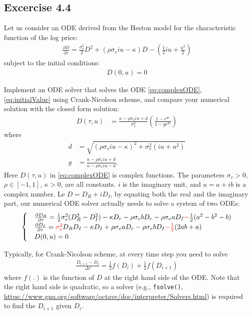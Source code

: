 \documentclass[10pt,a4paper,hidelinks,fleqn]{article}            %
\newcommand{\pder}[2]{\frac{\partial#1}{\partial#2}}
\begin{document}
\subsection*{Excercise 4.4}
Let us consider an ODE derived from the Heston model for the characteristic function \cite{heston93} of the log price:
\begin{align}
\pder{D}{\tau} = \frac{\sigma_v^2}{2} D^2 + (\rho\sigma_viu - \kappa)D - (\frac12 iu + \frac{u^2}{2})
\label{eq:complexODE}
\end{align}
subject to the initial conditions:
\begin{align}
D(0, u) = 0
\label{eq:initialValue}
\end{align}

Implement an ODE solver that solves the ODE \eqref{eq:complexODE}, \eqref{eq:initialValue} using Crank-Nicolson scheme,
and compare your numerical solution with the closed form solution:
\begin{align}
D(\tau, u) & = \frac{\kappa - \rho \sigma_v iu + d}{\sigma_v^2} \left( \frac{1-e^{d\tau}}{1-ge^{d\tau}} \right)
\label{eq:closedFormD}
\end{align}
where
\begin{align}
d & = \sqrt{(\rho \sigma_v iu - \kappa)^2 + \sigma_v^2 (iu+u^2)} \\
g & = \frac{\kappa - \rho \sigma_v iu + d}{\kappa - \rho \sigma_v iu - d}.
\end{align}
Here $D(\tau, u)$ in \eqref{eq:complexODE} is complex functions.
The parameters $\sigma_v > 0$, $\rho \in [-1, 1]$, $\kappa > 0$, are all constants. 
$i$ is the imaginary unit, and $u=a+ib$ is a complex number.
Le $D = D_R + iD_I$, by equating both the real and the imaginary part, 
our numerical ODE solver actually needs to solve a system of two ODEs:
\begin{align}
\begin{cases}
& \pder{D_R}{\tau} = \frac{1}{2}\sigma_v^2 (D_R^2 - D_I^2) - \kappa D_r  - \rho \sigma_v b D_r - \rho \sigma_v a D_I  \textbf{\textcolor{red}{$-$}} \frac{1}{2}(a^2 - b^2 - b) \\
& \pder{D_I}{\tau} = \textbf{\textcolor{red}{$\sigma_v^2$}} D_R D_I - \kappa D_I + \rho \sigma_v a D_r - \rho \sigma_v b D_I \textbf{\textcolor{red}{$-\frac12$}} (2ab + a) \\ 
& D(0, u) = 0
\end{cases}
\end{align}

Typically, for Crank-Nicolson scheme, at every time step you need to solve 
\begin{align*}
\frac{D_{i+1} - D_i}{\Delta \tau} = \frac{1}{2}f(D_i) + \frac{1}{2}f(D_{i+1})
\end{align*}
where $f(.)$ is the function of $D$ at the right hand side of the ODE.
Note that the right hand side is quadratic, 
so a solver (e.g., \verb=fsolve()=, \url{https://www.gnu.org/software/octave/doc/interpreter/Solvers.html}) is required to find the $D_{i+1}$ given $D_i$.
\end{document}
